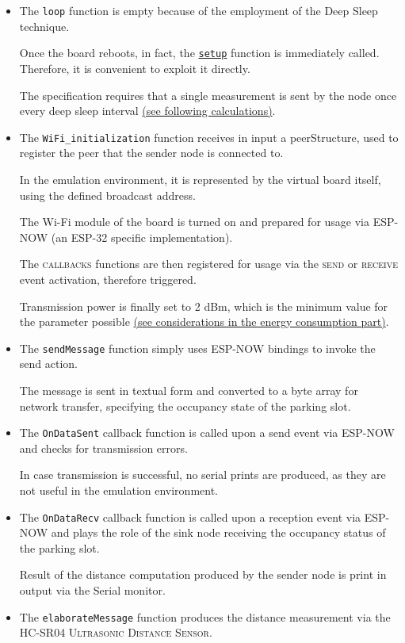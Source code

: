 \documentclass[a4paper,11pt]{article} %
\begin{document}
    \begin{itemize}
        \item The \texttt{loop} function is empty because of the employment of the Deep Sleep technique.

        Once the board reboots, in fact, the \hyperref[setup]{\texttt{setup}} function is immediately called.
        Therefore, it is convenient to exploit it directly.

        The specification requires that a single measurement is sent by the node once every deep sleep interval \hyperref[subsubsec:higher-duty-cycle]{(see following calculations)}.
        \item The \texttt{WiFi\_initialization} function receives in input a peerStructure, used to register the peer that the sender node is connected to.

        In the emulation environment, it is represented by the virtual board itself, using the defined broadcast address.

        The Wi-Fi module of the board is turned on and prepared for usage via \textsc{ESP-NOW} (an ESP-32 specific implementation).

        The \textsc{callbacks} functions are then registered for usage via the \textsc{send} or \textsc{receive} event activation, therefore triggered.

        Transmission power is finally set to 2 dBm, which is the minimum value for the parameter possible \hyperref[subsec:transmission-power-regulation]{(see considerations in the energy consumption part)}.
        \item The \texttt{sendMessage} function simply uses \textsc{ESP-NOW} bindings to invoke the send action.

        The message is sent in textual form and converted to a byte array for network transfer, specifying the occupancy state of the parking slot.
        \item The \texttt{OnDataSent} callback function is called upon a send event via \textsc{ESP-NOW} and checks for transmission errors.

        In case transmission is successful, no serial prints are produced, as they are not useful in the emulation environment.
        \item The \texttt{OnDataRecv} callback function is called upon a reception event via \textsc{ESP-NOW} and plays the role of the sink node receiving the occupancy status of the parking slot.

        Result of the distance computation produced by the sender node is print in output via the Serial monitor.
        \label{ultrasonic-distance-measurement}
        \item The \texttt{elaborateMessage} function produces the distance measurement via the \textsc{HC-SR04 Ultrasonic Distance Sensor}.


\end{itemize}
\end{document}
